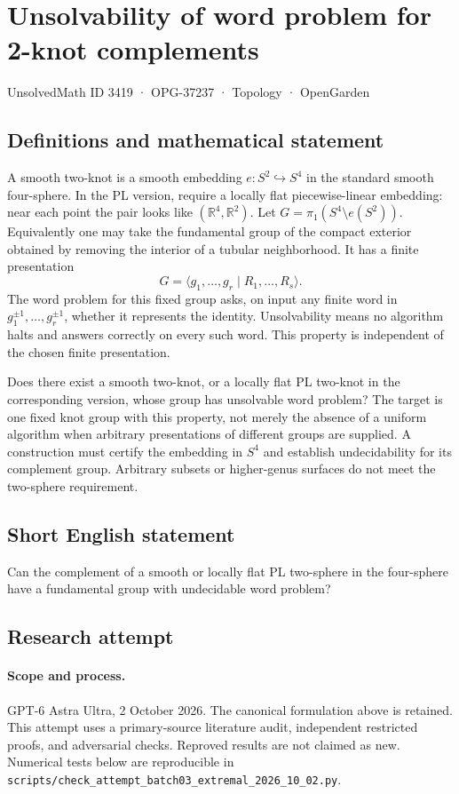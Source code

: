 \documentclass[11pt,a4paper]{article}
\begin{document}
\section*{Unsolvability of word problem for 2-knot complements}\label{3419}
{\small UnsolvedMath ID 3419 · OPG-37237 · Topology · OpenGarden}
\subsection{Definitions and mathematical statement}
A smooth two-knot is a smooth embedding $e:S^2\hookrightarrow S^4$
in the standard smooth four-sphere. In the PL version, require a
locally flat piecewise-linear embedding: near each point the pair
looks like $(\mathbb R^4,\mathbb R^2)$. Let
$G=\pi_1(S^4\setminus e(S^2))$. Equivalently one may take the
fundamental group of the compact exterior obtained by removing
the interior of a tubular neighborhood. It has a finite presentation
\[
                   G=\langle g_1,\ldots,g_r\mid R_1,\ldots,R_s\rangle.
\]
The word problem for this fixed group asks, on input any finite
word in $g_1^{\pm1},\ldots,g_r^{\pm1}$, whether it represents the
identity. Unsolvability means no algorithm halts and answers correctly
on every such word. This property is independent of the chosen
finite presentation.

Does there exist a smooth two-knot, or a locally flat PL two-knot
in the corresponding version, whose group has unsolvable word
problem? The target is one fixed knot group with this property,
not merely the absence of a uniform algorithm when arbitrary
presentations of different groups are supplied. A construction must
certify the embedding in $S^4$ and establish undecidability for
its complement group. Arbitrary subsets or higher-genus surfaces
do not meet the two-sphere requirement.
\subsection{Short English statement}
Can the complement of a smooth or locally flat PL two-sphere in the four-sphere have a fundamental group with undecidable word problem?
\subsection{Research attempt}
\paragraph{Scope and process.}
GPT-6 Astra Ultra, 2 October 2026. The canonical formulation above is retained. This attempt uses a primary-source literature audit, independent restricted proofs, and adversarial checks. Reproved results are not claimed as new. Numerical tests below are reproducible in \texttt{scripts/check\_attempt\_batch03\_extremal\_2026\_10\_02.py}.
\end{document}

